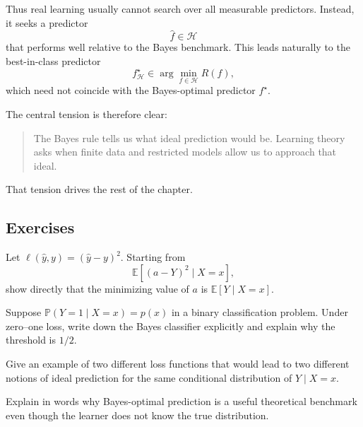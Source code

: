 Thus real learning usually cannot search over all measurable predictors. Instead, it seeks a predictor
\[
\hat f \in \mathcal H
\]
that performs well relative to the Bayes benchmark. This leads naturally to the best-in-class predictor
\[
f_{\mathcal H}^\star \in \arg\min_{f\in\mathcal H} R(f),
\]
which need not coincide with the Bayes-optimal predictor $f^\star$.

The central tension is therefore clear:

\begin{quote}
The Bayes rule tells us what ideal prediction would be. Learning theory asks when finite data and restricted models allow us to approach that ideal.
\end{quote}

That tension drives the rest of the chapter.


\subsection*{Exercises}

\begin{exercise}
Let $\ell(\hat y,y)=(\hat y-y)^2$. Starting from
\[
\mathbb E[(a-Y)^2\mid X=x],
\]
show directly that the minimizing value of $a$ is $\mathbb E[Y\mid X=x]$.
\end{exercise}

\begin{exercise}
Suppose $\mathbb P(Y=1\mid X=x)=p(x)$ in a binary classification problem. Under zero--one loss, write down the Bayes classifier explicitly and explain why the threshold is $1/2$.
\end{exercise}

\begin{exercise}
Give an example of two different loss functions that would lead to two different notions of ideal prediction for the same conditional distribution of $Y\mid X=x$.
\end{exercise}

\begin{exercise}
Explain in words why Bayes-optimal prediction is a useful theoretical benchmark even though the learner does not know the true distribution.
\end{exercise}

